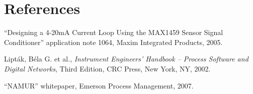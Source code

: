 \filbreak
\section*{References}


\noindent
``Designing a 4-20mA Current Loop Using the MAX1459 Sensor Signal Conditioner'' application note 1064, Maxim Integrated Products, 2005.  

\vskip 10pt

\noindent
Lipt\'ak, B\'ela G. et al., \textit{Instrument Engineers' Handbook -- Process Software and Digital Networks}, Third Edition, CRC Press, New York, NY, 2002.

\vskip 10pt

\noindent
``NAMUR'' whitepaper, Emerson Process Management, 2007.




















